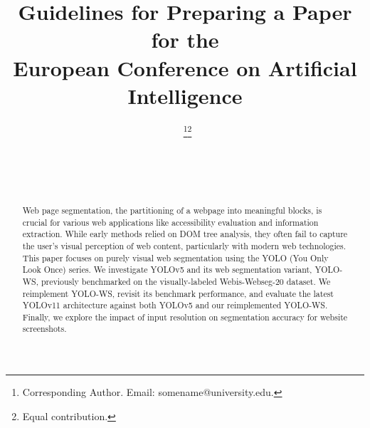 \documentclass{ecai}
\begin{document}

\begin{frontmatter}




\title{Guidelines for Preparing a Paper for the \\
European Conference on Artificial Intelligence}


\author[A]{~\thanks{Corresponding Author. Email: somename@university.edu.}\footnote{Equal contribution.}}
\author[B]{~\footnotemark}
\author[B,C]{~} 

\address[A]{Short Affiliation of First Author}
\address[B]{Short Affiliation of Second Author and Third Author}
\address[C]{Short Alternate Affiliation of Third Author}


\begin{abstract}

Web page segmentation, the partitioning of a webpage into meaningful blocks, is crucial for various web applications like accessibility evaluation and information extraction. While early methods relied on DOM tree analysis, they often fail to capture the user's visual perception of web content, particularly with modern web technologies. This paper focuses on purely visual web segmentation using the YOLO (You Only Look Once) series. We investigate YOLOv5 and its web segmentation variant, YOLO-WS, previously benchmarked on the visually-labeled Webis-Webseg-20 dataset. We reimplement YOLO-WS, revisit its benchmark performance, and evaluate the latest YOLOv11 architecture against both YOLOv5 and our reimplemented YOLO-WS. Finally, we explore the impact of input resolution on segmentation accuracy for website screenshots.\\

\end{abstract}

\end{frontmatter}
\end{document}
